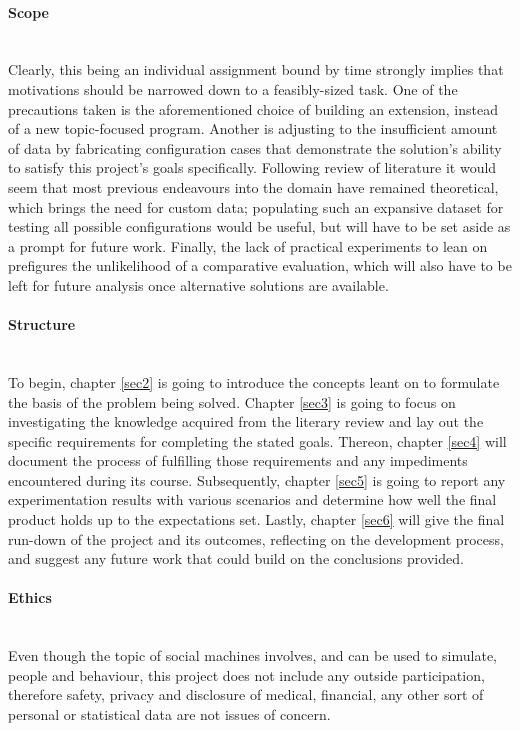 \documentclass[12pt]{article}
\begin{document}
		\paragraph{Scope}\hfill\\
			Clearly, this being an individual assignment bound by time strongly implies that motivations should be narrowed down to a feasibly-sized task. 
			One of the precautions taken is the aforementioned choice of building an extension, instead of a new topic-focused program.
			Another is adjusting to the insufficient amount of data by fabricating configuration cases that demonstrate the solution's ability to satisfy this project's goals specifically.
			Following review of literature it would seem that most previous endeavours into the domain have remained theoretical, which brings the need for custom data; 
			populating such an expansive dataset for testing all possible configurations would be useful, but will have to be set aside as a prompt for future work.
			Finally, the lack of practical experiments to lean on prefigures the unlikelihood of a comparative evaluation, which will also have to be left for future analysis once alternative solutions are available. 
	
		\paragraph{Structure}\hfill\\
			To begin, chapter \ref{sec2} is going to introduce the concepts leant on to formulate the basis of the problem being solved. Chapter \ref{sec3} is going to focus on investigating the knowledge acquired from the literary review and lay out the specific requirements for completing the stated goals. Thereon, chapter \ref{sec4} will document the process of fulfilling those requirements and any impediments encountered during its course. Subsequently, chapter \ref{sec5} is going to report any experimentation results with various scenarios and determine how well the final product holds up to the expectations set. Lastly, chapter \ref{sec6} will give the final run-down of the project and its outcomes, reflecting on the development process, and suggest any future work that could build on the conclusions provided.
		
		\paragraph{Ethics}\hfill\\
			Even though the topic of social machines involves, and can be used to simulate, people and behaviour, this project does not include any outside participation, therefore safety, privacy and disclosure of medical, financial, any other sort of personal or statistical data are not issues of concern.
		
\end{document}
